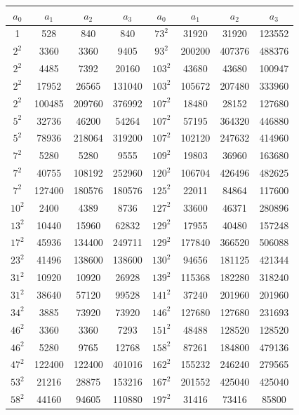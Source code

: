 \documentclass[10pt]{amsart}
\theoremstyle{plain}
\begin{document}
\begin{table}[htbp]
\centering
\begin{tabular}{|c|c|c|c||c|c|c|c|}
\hline
$a_0$ & $a_1$ & $a_2$ & $a_3$ & $a_0$ & $a_1$ & $a_2$ & $a_3$ \\
\hline
 1 & 528 & 840 & 840 & $73^2$ & 31920 & 31920 & 123552 \\
 $2^2$ & 3360 & 3360 & 9405 & $93^2$ & 200200 & 407376 & 488376 \\
 $2^2$ & 4485 & 7392 & 20160 & $103^2$ & 43680 & 43680 & 100947 \\
 $2^2$ & 17952 & 26565 & 131040 & $103^2$ & 105672 & 207480 & 333960 \\
 $2^2$ & 100485 & 209760 & 376992 & $107^2$ & 18480 & 28152 & 127680 \\
 $5^2$ & 32736 & 46200 & 54264 & $107^2$ & 57195 & 364320 & 446880 \\
 $5^2$ & 78936 & 218064 & 319200 & $107^2$ & 102120 & 247632 & 414960 \\
 $7^2$ & 5280 & 5280 & 9555 & $109^2$ & 19803 & 36960 & 163680 \\
 $7^2$ & 40755 & 108192 & 252960 & $120^2$ & 106704 & 426496 & 482625 \\
 $7^2$ & 127400 & 180576 & 180576 & $125^2$ & 22011 & 84864 & 117600 \\
 $10^2$ & 2400 & 4389 & 8736 & $127^2$ & 33600 & 46371 & 280896 \\
 $13^2$ & 10440 & 15960 & 62832 & $129^2$ & 17955 & 40480 & 157248 \\
 $17^2$ & 45936 & 134400 & 249711 & $129^2$ & 177840 & 366520 & 506088 \\
 $23^2$ & 41496 & 138600 & 138600 & $130^2$ & 94656 & 181125 & 421344 \\
 $31^2$ & 10920 & 10920 & 26928 & $139^2$ & 115368 & 182280 & 318240 \\
 $31^2$ & 38640 & 57120 & 99528 & $141^2$ & 37240 & 201960 & 201960 \\
 $34^2$ & 3885 & 73920 & 73920 & $146^2$ & 127680 & 127680 & 231693 \\
 $46^2$ & 3360 & 3360 & 7293 & $151^2$ & 48488 & 128520 & 128520 \\
 $46^2$ & 5280 & 9765 & 12768 & $158^2$ & 87261 & 184800 & 479136 \\
 $47^2$ & 122400 & 122400 & 401016 & $162^2$ & 155232 & 246240 & 279565 \\
 $53^2$ & 21216 & 28875 & 153216 & $167^2$ & 201552 & 425040 & 425040 \\
 $58^2$ & 44160 & 94605 & 110880 & $197^2$ & 31416 & 73416 & 85800 \\

\end{tabular}
\end{table}
\end{document}
